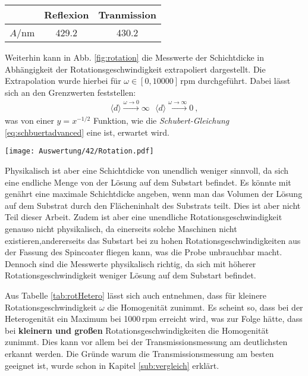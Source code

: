 \begin{center}
	\captionsetup{type=table}
	\begin{tabular}{l | c | c }
		  & Reflexion & Tranmission \\
		  \hline
		  $A$/nm & 429.2 & 430.2 \\
	\end{tabular}
	\label{tab:rot}
\end{center}
Weiterhin kann in Abb. \ref{fig:rotation} die Messwerte der Schichtdicke in Abhängigkeit der Rotationsgeschwindigkeit extrapoliert dargestellt. Die Extrapolation wurde hierbei für $\omega \in [0, 10000]\,\mathrm{rpm}$ durchgeführt.
Dabei lässt sich an den Grenzwerten feststellen:
\begin{gather}
    \langle d \rangle \xrightarrow{\omega\rightarrow 0} \infty~~~\langle d \rangle \xrightarrow{\omega\rightarrow \infty} 0~,
\end{gather}
was von einer $y = x^{-1/2}$ Funktion, wie die \textit{Schubert-Gleichung} \ref{eq:schbuertadvanced} eine ist, erwartet wird.
\begin{center}
	\captionsetup{type=figure}
	\texttt{[image: Auswertung/42/Rotation.pdf]}
	\label{fig:rotation}
\end{center}
Physikalisch ist aber eine Schichtdicke von unendlich weniger sinnvoll, da sich eine endliche Menge von der Lösung auf dem Substart befindet. Es könnte mit genährt eine maximale Schichtdicke angeben, wenn man das Volumen der Lösung auf dem Substrat durch den Flächeninhalt des Substrats teilt. Dies ist aber nicht Teil dieser Arbeit. Zudem ist aber eine unendliche Rotationsgeschwindigkeit genauso nicht physikalisch, da einerseits solche Maschinen nicht existieren,andererseits das Substart bei zu hohen Rotationsgeschwindigkeiten aus der Fassung des Spincoater fliegen kann, was die Probe unbrauchbar macht. Dennoch sind die Messwerte physikalisch richtig, da sich mit höherer Rotationsgeschwindigkeit weniger Lösung auf dem Substart befindet. 

Aus Tabelle \ref{tab:rotHetero} lässt sich auch entnehmen, dass für kleinere Rotationsgeschwindigkeit $\omega$ die Homogenität zunimmt. Es scheint so, dass bei der Heterogenität ein Maximum bei 1000\,rpm erreicht wird, was zur Folge hätte, dass bei \textbf{kleinern und großen} Rotationsgeschwindigkeiten  die Homogenität zunimmt. Dies kann vor allem bei der Transmissionsmessung am deutlichsten erkannt werden. Die Gründe warum die Transmissionsmessung am besten geeignet ist, wurde schon in Kapitel \ref{sub:vergleich} erklärt.